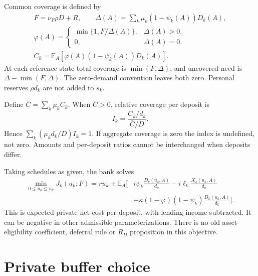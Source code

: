 \documentclass[11pt]{article}
\theoremstyle{definition}
\newcommand{\E}{\mathbb E}
\begin{document}
Common coverage is defined by
\begin{equation}\label{eq:capacity}
\begin{gathered}
 F=\nu_F\rho D+R,\qquad \Delta(A)=\sum_k\mu_k(1-\psi_k(A))D_k(A),\\
 \varphi(A)=
 \begin{cases}\min\{1,F/\Delta(A)\},&\Delta(A)>0,\\0,&\Delta(A)=0,\end{cases}\\
 C_k=\E_A[\varphi(A)(1-\psi_k(A))D_k(A)].
\end{gathered}
\end{equation}
At each reference state total coverage is $\min(F,\Delta)$, and uncovered need is $\Delta-\min(F,\Delta)$. The zero-demand convention leaves both zero. Personal reserves $\rho d_k$ are not added to $s_k$.

Define $\bar C=\sum_k\mu_k C_k$. When $\bar C>0$, relative coverage per deposit is
\begin{equation}\label{eq:incidence}
 I_k=\frac{C_k/d_k}{\bar C/D}.
\end{equation}
Hence $\sum_k(\mu_kd_k/D)I_k=1$. If aggregate coverage is zero the index is undefined, not zero. Amounts and per-deposit ratios cannot be interchanged when deposits differ.

Taking schedules as given, the bank solves
\begin{equation}\label{eq:objective}
\begin{split}
 \min_{0\leq u_k\leq\bar u_k}J_k(u_k;F)=ru_k+\E_A\bigg[
 &i\psi_k\frac{D_k(u_k,A)}{d_k}-i\ell_k\frac{X_k(u_k,A)}{d_k}\\
 &+\kappa(1-\varphi)(1-\psi_k)\frac{D_k(u_k,A)}{d_k}\bigg].
\end{split}
\end{equation}
This is expected private net cost per deposit, with lending income subtracted. It can be negative in other admissible parameterizations. There is no old asset-eligibility coefficient, deferral rule or $R_D$ proposition in this objective.

\section{Private buffer choice}
\end{document}

